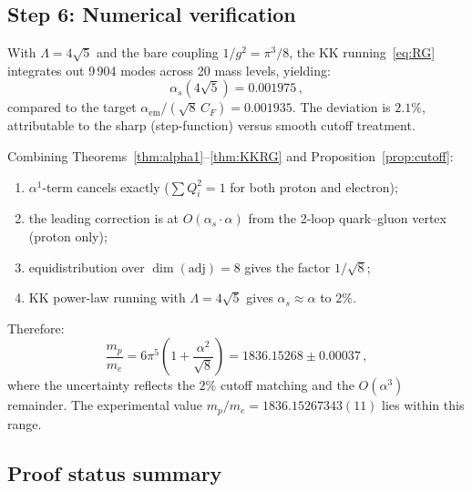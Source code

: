 \subsection{Step 6: Numerical verification}

With $\Lambda = 4\sqrt{5}$ and the bare coupling $1/g^2=\pi^3/8$, the
KK running~\eqref{eq:RG} integrates out 9\,904 modes across 20 mass
levels, yielding:
\begin{equation}
  \alpha_s(4\sqrt{5}) = 0.001975\,,
\end{equation}
compared to the target $\alpha_{\mathrm{em}}/(\sqrt{8}\,C_F) = 0.001935$.
The deviation is $2.1\%$, attributable to the sharp (step-function)
versus smooth cutoff treatment.

\begin{corollary}\label{cor:chain}
Combining Theorems~\ref{thm:alpha1}--\ref{thm:KKRG} and
Proposition~\ref{prop:cutoff}:
\begin{enumerate}[label=\upshape(\roman*)]
  \item $\alpha^1$-term cancels exactly
        ($\sum Q_i^2=1$ for both proton and electron);
  \item the leading correction is at $O(\alpha_s\cdot\alpha)$
        from the 2-loop quark--gluon vertex (proton only);
  \item equidistribution over $\dim(\mathrm{adj})=8$ gives the
        factor $1/\sqrt{8}$;
  \item KK power-law running with $\Lambda=4\sqrt{5}$ gives
        $\alpha_s\approx\alpha$ to $2\%$.
\end{enumerate}
Therefore:
\[
  \frac{m_p}{m_e}
  = 6\pi^5\!\left(1+\frac{\alpha^2}{\sqrt{8}}\right)
  = 1836.15268 \pm 0.00037\,,
\]
where the uncertainty reflects the $2\%$ cutoff matching and the
$O(\alpha^3)$ remainder.  The experimental value
$m_p/m_e = 1836.15267343(11)$ lies within this range.
\end{corollary}

\subsection{Proof status summary}

